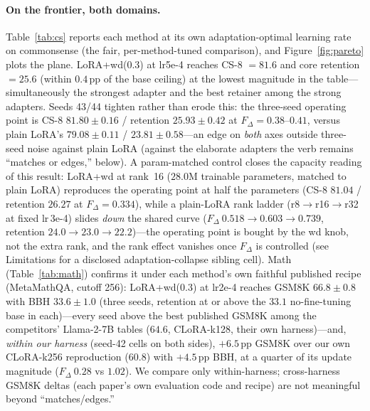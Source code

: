 \documentclass[11pt]{article}
\newcommand{\dw}{F_{\Delta}}
\begin{document}
\paragraph{On the frontier, both domains.} Table~\ref{tab:cs} reports each method at
its own adaptation-optimal learning rate on commonsense (the fair, per-method-tuned
comparison), and Figure~\ref{fig:pareto} plots the plane. LoRA{+}wd(0.3) at lr5e-4
reaches CS-8 $=\!81.6$ and core retention $=\!25.6$ (within $0.4$\,pp of the base
ceiling) at the lowest magnitude in the table---simultaneously the strongest adapter
and the best retainer among the strong adapters. Seeds 43/44 tighten rather than
erode this: the three-seed operating point is CS-8 $81.80\!\pm\!0.16$ / retention
$25.93\!\pm\!0.42$ at $\dw\!=\!0.38$--$0.41$, versus plain LoRA's
$79.08\!\pm\!0.11$ / $23.81\!\pm\!0.58$---an edge on \emph{both} axes outside
three-seed noise against plain LoRA (against the elaborate adapters the verb
remains ``matches or edges,'' below). A param-matched control closes the
capacity reading of this result: LoRA{+}wd at rank~16 ($28.0$M trainable
parameters, matched to plain LoRA) reproduces the operating point at half the
parameters (CS-8 $81.04$ / retention $26.27$ at $\dw\!=\!0.334$), while a
plain-LoRA rank ladder (r8${\to}$r16${\to}$r32 at fixed lr\,3e-4) slides
\emph{down} the shared curve ($\dw\ 0.518\!\to\!0.603\!\to\!0.739$, retention
$24.0\!\to\!23.0\!\to\!22.2$)---the operating point is bought by the wd knob,
not the extra rank, and the rank effect vanishes once $\dw$ is controlled
(see Limitations for a disclosed adaptation-collapse sibling cell). Math
(Table~\ref{tab:math})
confirms it under each method's own faithful published recipe (MetaMathQA,
cutoff 256): LoRA{+}wd(0.3) at lr2e-4 reaches GSM8K $66.8\!\pm\!0.8$ with BBH
$33.6\!\pm\!1.0$ (three seeds, retention at or above the $33.1$ no-fine-tuning
base in each)---every seed above the best published GSM8K among the competitors'
Llama-2-7B tables ($64.6$, CLoRA-k128, their own harness)---and, \emph{within our
harness} (seed-42 cells on
both sides), $+6.5$\,pp GSM8K
over our own CLoRA-k256 reproduction ($60.8$) with $+4.5$\,pp BBH, at a quarter
of its update magnitude ($\dw\ 0.28$ vs $1.02$). We compare only within-harness;
cross-harness GSM8K deltas (each paper's own evaluation code and recipe) are not
meaningful beyond ``matches/edges.''
\end{document}
